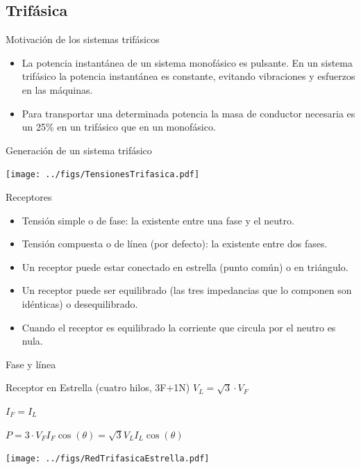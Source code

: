 \documentclass[xcolor={usenames,svgnames,dvipsnames}]{beamer}
\begin{document}
\subsection{Trifásica}
\label{sec:orgbf5ca2b}

\begin{frame}[label={sec:orga50b904}]{Motivación de los sistemas trifásicos}
\begin{itemize}
\item La potencia instantánea de un sistema monofásico es pulsante. En un
sistema trifásico la potencia instantánea es constante, evitando
vibraciones y esfuerzos en las máquinas.

\item Para transportar una determinada potencia la masa de conductor
necesaria es un 25\% en un trifásico que en un monofásico.
\end{itemize}
\end{frame}

\begin{frame}[label={sec:orge9ac39a}]{Generación de un sistema trifásico}
\begin{center}
\texttt{[image: ../figs/TensionesTrifasica.pdf]}
\end{center}
\end{frame}

\begin{frame}[label={sec:org84c45e6}]{Receptores}
\begin{itemize}
\item \alert{Tensión simple o de fase}: la existente entre una fase y el neutro.
\item \alert{Tensión compuesta o de línea} (por defecto): la existente entre dos fases.
\item Un receptor puede estar conectado en \alert{estrella} (punto común) o en \alert{triángulo}.
\item Un receptor puede ser \alert{equilibrado} (las tres impedancias que lo componen son idénticas) o \alert{desequilibrado}.
\item Cuando el receptor es equilibrado la corriente que circula por el neutro es nula.
\end{itemize}
\end{frame}

\begin{frame}[label={sec:org4105288}]{Fase y línea}
\begin{block}{Receptor en Estrella (cuatro hilos, 3F+1N)}
\(V_{L}=\sqrt{3}\cdot V_{F}\) 

\(I_{F}=I_{L}\)

\(P=3\cdot V_{F}I_{F}\cos(\theta)=\sqrt{3}V_{L}I_{L}\cos(\theta)\)
\begin{center}
\texttt{[image: ../figs/RedTrifasicaEstrella.pdf]}
\end{center}
\end{block}
\end{frame}
\end{document}
